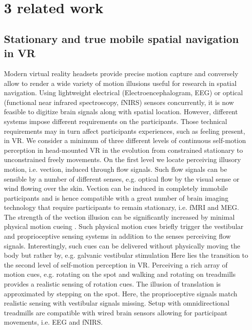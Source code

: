 \section{3 related work}
\subsection{Stationary and true mobile spatial navigation in VR}
Modern virtual reality headsets provide precise motion capture and conversely allow to render a wide variety of motion illusions useful for research in spatial navigation. Using lightweight electrical (Electroencephalogram, EEG) or optical (functional near infrared spectroscopy, fNIRS) sensors concurrently, it is now feasible to digitize brain signals along with spatial location. However, different systems impose different requirements on the participants. Those technical requirements may in turn affect participants experiences, such as feeling present, in VR. \cite{} %
We consider a minimum of three different levels of continuous self-motion perception in head-mounted VR in the evolution from constrained stationary to unconstrained freely movements. On the first level we locate perceiving illusory motion, i.e. vection, induced through flow signals. Such flow signals can be sensible by a number of different senses, e.g. optical flow by the visual sense or wind flowing over the skin. Vection can be induced in completely immobile participants and is hence compatible with a great number of brain imaging technology that require participants to remain stationary, i.e. fMRI and MEG. The strength of the vection illusion can be significantly increased by minimal physical motion cueing \cite{}. %
Such physical motion cues briefly trigger the vestibular and proprioceptive sensing systems in addition to the senses perceiving flow signals. Interestingly, such cues can be delivered without physically moving the body but rather by, e.g. galvanic vestibular stimulation \cite{} %
Here lies the transition to the second level of self-motion perception in VR. Perceiving a rich array of motion cues, e.g. rotating on the spot and walking and rotating on treadmills provides a realistic sensing of rotation cues. The illusion of translation is approximated by stepping on the spot. Here, the proprioceptive signals match realistic sensing with vestibular signals missing. Setup with omnidirectional treadmills are compatible with wired brain sensors allowing for participant movements, i.e. EEG and fNIRS. %
